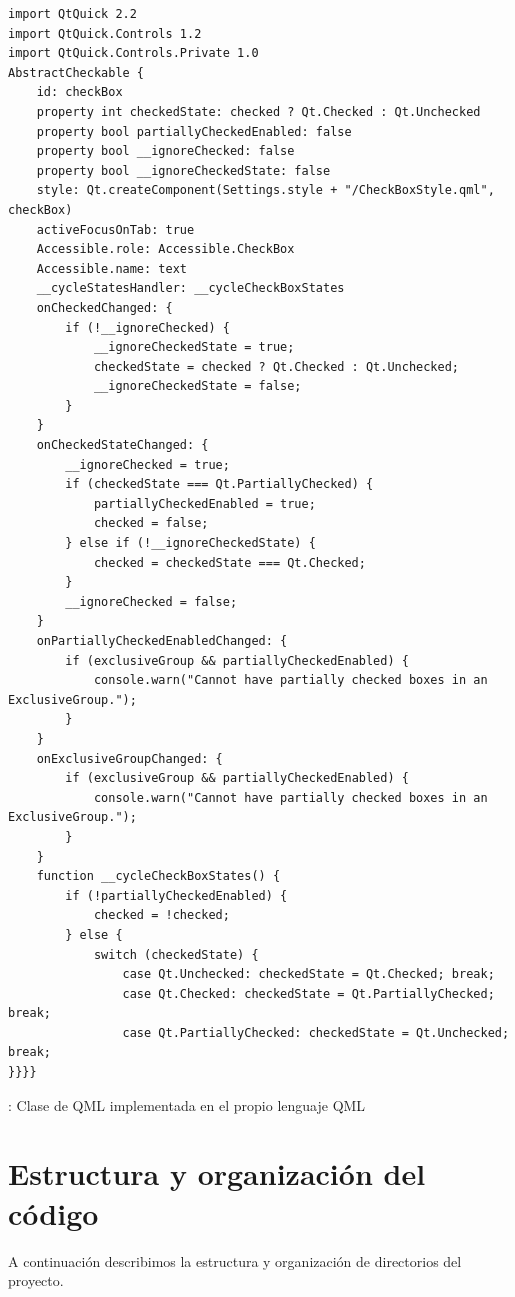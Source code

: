 \begin{listing}[phtb]
\begin{verbatim}
import QtQuick 2.2
import QtQuick.Controls 1.2
import QtQuick.Controls.Private 1.0
AbstractCheckable {
    id: checkBox
    property int checkedState: checked ? Qt.Checked : Qt.Unchecked
    property bool partiallyCheckedEnabled: false
    property bool __ignoreChecked: false
    property bool __ignoreCheckedState: false
    style: Qt.createComponent(Settings.style + "/CheckBoxStyle.qml", checkBox)
    activeFocusOnTab: true
    Accessible.role: Accessible.CheckBox
    Accessible.name: text
    __cycleStatesHandler: __cycleCheckBoxStates
    onCheckedChanged: {
        if (!__ignoreChecked) {
            __ignoreCheckedState = true;
            checkedState = checked ? Qt.Checked : Qt.Unchecked;
            __ignoreCheckedState = false;
        }
    }
    onCheckedStateChanged: {
        __ignoreChecked = true;
        if (checkedState === Qt.PartiallyChecked) {
            partiallyCheckedEnabled = true;
            checked = false;
        } else if (!__ignoreCheckedState) {
            checked = checkedState === Qt.Checked;
        }
        __ignoreChecked = false;
    }
    onPartiallyCheckedEnabledChanged: {
        if (exclusiveGroup && partiallyCheckedEnabled) {
            console.warn("Cannot have partially checked boxes in an ExclusiveGroup.");
        }
    }
    onExclusiveGroupChanged: {
        if (exclusiveGroup && partiallyCheckedEnabled) {
            console.warn("Cannot have partially checked boxes in an ExclusiveGroup.");
        }
    }
    function __cycleCheckBoxStates() {
        if (!partiallyCheckedEnabled) {
            checked = !checked;
        } else {
            switch (checkedState) {
                case Qt.Unchecked: checkedState = Qt.Checked; break;
                case Qt.Checked: checkedState = Qt.PartiallyChecked; break;
                case Qt.PartiallyChecked: checkedState = Qt.Unchecked; break;
}}}}
\end{verbatim}
\caption{: Clase de QML  implementada en el propio lenguaje QML}
\label{lst:qml-checkbox}
\end{listing}

\FloatBarrier
\section{Estructura y organización del código}

A continuación describimos la estructura y organización de directorios del proyecto.

